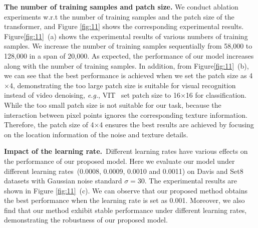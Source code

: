 \documentclass[journal]{IEEEtran}
\begin{document}
\begin{table}[ht]
\renewcommand{\arraystretch}{1.2}

\end{table}



\noindent
\textbf{The number of training samples and patch size.} 
We conduct ablation experiments w.r.t the number of training samples and the patch size of the transformer, and Figure \ref{fig:11} shows the corresponding experimental results. Figure\ref{fig:11}~(a) shows the experimental results of various numbers of training samples. We increase the number of training samples sequentially from 58,000 to 128,000 in a span of 20,000. As expected, the performance of our model increases along with the number of training samples. In addition, from Figure\ref{fig:11}~(b), we can see that the best performance is achieved when we set the patch size as 4$\times$4, demonstrating the too large patch size is suitable for visual recognition instead of video denoising, \emph{e.g.}, VIT~\cite{kolesnikov2021image} set patch size to 16$\times$16 for classification. While the too small patch size is not suitable for our task, because the interaction between pixel points ignores the corresponding texture information. Therefore, the patch size of 4$\times$4 ensures the best results are achieved by focusing on the location information of the noise and texture details.

\noindent
\textbf{Impact of the learning rate.}~Different learning rates have various effects on the performance of our proposed model. Here we evaluate our model under different learning rates~(0.0008, 0.0009, 0.0010 and 0.0011) on Davis and Set8 datasets with Gaussian noise standard $\sigma=30$. The experimental results are shown in Figure \ref{fig:11}~(c). We can observe that our proposed method obtains the best performance when the learning rate is set as 0.001. Moreover, we also find that our method exhibit stable performance under different learning rates, demonstrating the robustness of our proposed model.
\end{document}
